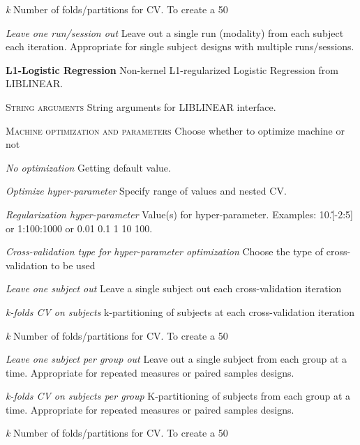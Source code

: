 \textit{k}
Number of folds/partitions for CV. To create a 50%


\textit{Leave one run/session out}
Leave out a single run (modality) from each subject each iteration. Appropriate for single subject designs with multiple runs/sessions.


\textbf{L1-Logistic Regression}
Non-kernel L1-regularized Logistic Regression from LIBLINEAR.


\textsc{String arguments}
String arguments for LIBLINEAR interface.


\textsc{Machine optimization and parameters}
Choose whether to optimize machine or not


\textsl{No optimization}
Getting default value.


\textsl{Optimize hyper-parameter}
Specify range of values and nested CV.


\textit{Regularization hyper-parameter}
Value(s) for hyper-parameter. Examples: 10.\^[-2:5] or 1:100:1000 or 0.01 0.1 1 10 100.


\textit{Cross-validation type for hyper-parameter optimization}
Choose the type of cross-validation to be used


\textit{Leave one subject out}
Leave a single subject out each cross-validation iteration


\textit{k-folds CV on subjects}
k-partitioning of subjects at each cross-validation iteration


\textit{k}
Number of folds/partitions for CV. To create a 50%


\textit{Leave one subject per group out}
Leave out a single subject from each group at a time. Appropriate for repeated measures or paired samples designs.


\textit{k-folds CV on subjects per group}
K-partitioning of subjects from each group at a time. Appropriate for repeated measures or paired samples designs.


\textit{k}
Number of folds/partitions for CV. To create a 50%


